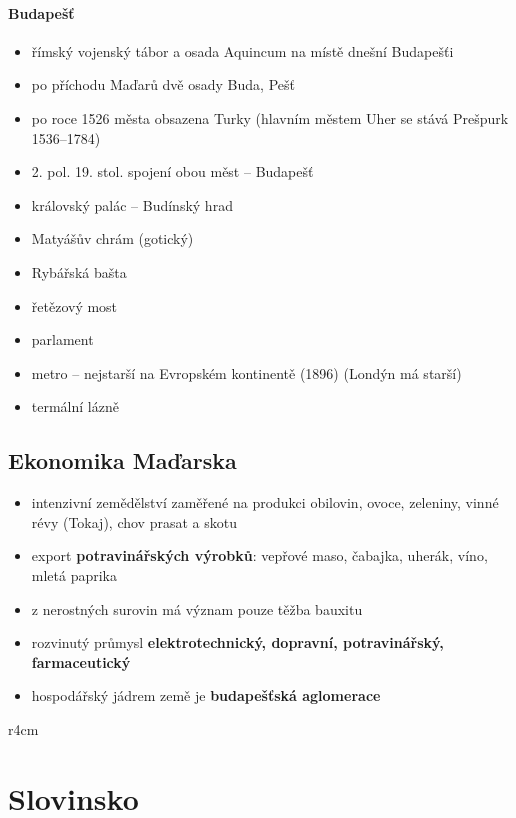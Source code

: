 \paragraph{Budapešť}
\begin{itemize}
\item římský vojenský tábor a osada Aquincum na místě dnešní Budapešťi
\item po příchodu Maďarů dvě osady Buda, Pešť
\item po roce 1526 města obsazena Turky (hlavním městem Uher se stává Prešpurk 1536--1784)
\item 2. pol. 19. stol. spojení obou měst -- Budapešť
\item královský palác -- Budínský hrad
\item Matyášův chrám (gotický)
\item Rybářská bašta
\item řetězový most
\item parlament
\item metro -- nejstarší na Evropském kontinentě (1896) (Londýn má starší)
\item termální lázně 
\end{itemize}

\subsection{Ekonomika Maďarska}
\begin{itemize}
\item intenzivní zemědělství zaměřené na produkci obilovin, ovoce, zeleniny, vinné révy (Tokaj), chov prasat a skotu
\item export \textbf{potravinářských výrobků}: vepřové maso, čabajka, uherák, víno, mletá paprika
\item z nerostných surovin má význam pouze těžba bauxitu
\item rozvinutý průmysl \textbf{elektrotechnický, dopravní, potravinářský, farmaceutický}
\item hospodářský jádrem země je \textbf{budapešťská aglomerace}
\end{itemize}



\newpage
\mbox{}
\vspace{-1.5cm}
\begin{wrapfigure}{r}{4cm}
\vspace{-50pt}
\end{wrapfigure}	
\section{Slovinsko}
